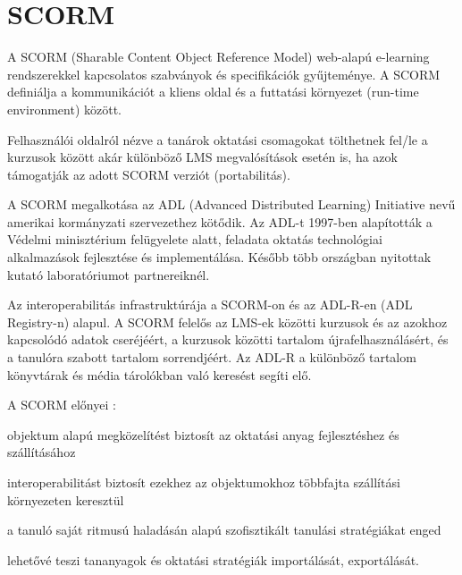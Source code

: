 \section{SCORM}
A SCORM (Sharable Content Object Reference Model) web-alapú e-learning rendszerekkel  kapcsolatos szabványok és specifikációk gyűjteménye. A SCORM definiálja a kommunikációt a kliens oldal és a futtatási környezet (run-time environment) között.

Felhasználói oldalról nézve a tanárok oktatási csomagokat tölthetnek fel/le a kurzusok között akár különböző LMS megvalósítások esetén is, ha azok támogatják az adott SCORM verziót (portabilitás).

A SCORM megalkotása az ADL (Advanced Distributed Learning) Initiative nevű amerikai kormányzati szervezethez kötődik. Az ADL-t 1997-ben alapították a Védelmi minisztérium felügyelete alatt, feladata oktatás technológiai alkalmazások fejlesztése és implementálása. Később több országban nyitottak kutató laboratóriumot partnereiknél.

Az interoperabilitás infrastruktúrája a SCORM-on és az ADL-R-en (ADL Registry-n) alapul. A SCORM felelős az LMS-ek közötti kurzusok és az azokhoz kapcsolódó adatok cseréjéért, a kurzusok közötti tartalom újrafelhasználásért, és a tanulóra szabott tartalom sorrendjéért. Az ADL-R a különböző tartalom könyvtárak és média tárolókban való keresést segíti elő.

A SCORM előnyei \cite{sco}:
\begin{sajat_itemize}
\item objektum alapú megközelítést biztosít az oktatási anyag fejlesztéshez és szállításához
\item interoperabilitást biztosít ezekhez az objektumokhoz többfajta szállítási környezeten keresztül
\item a tanuló saját ritmusú haladásán alapú szofisztikált tanulási stratégiákat enged
\item lehetővé teszi tananyagok és oktatási stratégiák importálását, exportálását.
\end{sajat_itemize}
